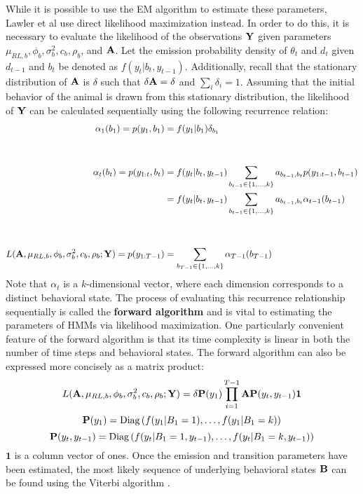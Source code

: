 While it is possible to use the EM algorithm to estimate these parameters, Lawler et al use direct likelihood maximization instead. In order to do this, it is necessary to evaluate the likelihood of the observations $\mathbf{Y}$ given parameters $\mu_{RL,b}, \phi_b, \sigma_b^2, c_b, \rho_b$, and $\mathbf{A}$. Let the emission probability density of $\theta_t$ and $d_t$ given $d_{t-1}$ and $b_t$ be denoted as $f(y_t|b_t,y_{t-1})$. Additionally, recall that the stationary distribution of $\mathbf{A}$ is $\delta$ such that $\delta \mathbf{A} = \delta$ and $\sum_i \delta_i = 1$. Assuming that the initial behavior of the animal is drawn from this stationary distribution, the likelihood of $\mathbf{Y}$ can be calculated sequentially using the following recurrence relation:
%
\begin{align*}
	\alpha_1(b_1) = p(y_1,b_1) &= f(y_1|b_1)\delta_{b_1} \\\\\\
	\alpha_t(b_t) = p(y_{1:t},b_t) &= f(y_t|b_t,y_{t-1})\sum_{b_{t-1} \in \{1,\ldots,k\}}a_{b_{t-1},b_t}p(y_{1:t-1},b_{t-1}) \\
	&= f(y_t|b_t,y_{t-1})\sum_{b_{t-1} \in \{1,\ldots,k\}}a_{b_{t-1},b_t} \alpha_{t-1}(b_{t-1}) \\\\\\
	L(\mathbf{A},\mu_{RL,b},\phi_b,\sigma_b^2,c_b,\rho_b; \mathbf{Y}) = p(y_{1:T-1}) &= \sum_{b_{T-1} \in \{1,\ldots,k\}} \alpha_{T-1}(b_{T-1}) 
\end{align*}	
%
Note that $\alpha_t$ is a $k$-dimensional vector, where each dimension corresponds to a distinct behavioral state. The process of evaluating this recurrence relationship sequentially is called the \textbf{forward algorithm} and is vital to estimating the parameters of HMMs via likelihood maximization. One particularly convenient feature of the forward algorithm is that its time complexity is linear in both the number of time steps and behavioral states. The forward algorithm can also be expressed more concisely as a matrix product:
%
$$L(\mathbf{A},\mu_{RL,b},\phi_b,\sigma_b^2,c_b,\rho_b; \mathbf{Y}) = \delta \mathbf{P}(y_1) \prod_{i=1}^{T-1} \mathbf{A} \mathbf{P}(y_t,y_{t-1}) \mathbf{1}$$
$$\mathbf{P}(y_1) = \text{Diag}\left( f(y_1|B_1 = 1), \ldots, f(y_1|B_1 = k) \right)$$
$$\mathbf{P}(y_t,y_{t-1}) = \text{Diag}\left( f(y_t|B_1 = 1, y_{t-1}), \ldots, f(y_t|B_1 = k, y_{t-1}) \right)$$
%
$\mathbf{1}$ is a column vector of ones. Once the emission and transition parameters have been estimated, the most likely sequence of underlying behavioral states $\mathbf{B}$ can be found using the Viterbi algorithm \citep{Viterbi:1967}.

